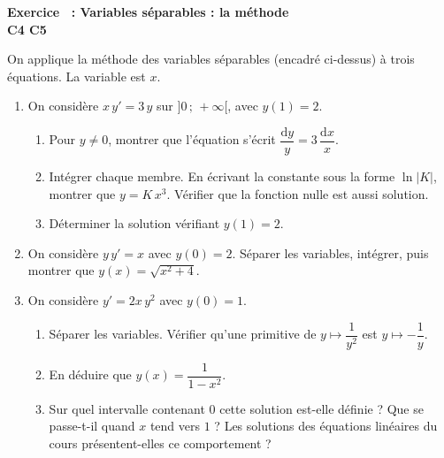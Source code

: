 \documentclass[a4paper,11pt]{article}
\newcounter{exo}
\newcommand{\exo}[4]{\needspace{0.5\textheight}\refstepcounter{exo}\label{exo:\theexo}\vspace{8pt}%
\begin{tcolorbox}[colback=uimmlightblue, colframe=uimmblue, boxrule=0.8pt, arc=2pt, left=6pt, right=6pt, top=3pt, bottom=3pt]
{\color{uimmblue}\bfseries Exercice \theexo\ : #1}\\
{\small\color{uimmred}\bfseries #2\quad #3}%
\if\relax\detokenize{#4}\relax\else\\{\footnotesize\color{uimmgray}\itshape #4}\fi
\end{tcolorbox}}
\newcommand{\rep}[1]{\par\noindent\begin{minipage}[t][#1cm]{\linewidth}\mbox{}\end{minipage}\par}
\newcommand{\dd}{\mathrm{d}}
\begin{document}
\exo{Variables séparables : la méthode}{C4 C5}{[S01] [C01] [C02]}{}
On applique la méthode des variables séparables (encadré ci-dessus) à trois équations. La variable est $x$.
\begin{enumerate}
  \needspace{5cm}
  \item On considère $x\,y' = 3\,y$ sur $]0\,;\,+\infty[$, avec $y(1) = 2$.
  \begin{enumerate}
    \item Pour $y \neq 0$, montrer que l'équation s'écrit $\dfrac{\dd y}{y} = 3\,\dfrac{\dd x}{x}$.
    \rep{2}
    \item Intégrer chaque membre. En écrivant la constante sous la forme $\ln|K|$, montrer que $y = K\,x^3$. Vérifier que la fonction nulle est aussi solution.
    \rep{3}
    \item Déterminer la solution vérifiant $y(1) = 2$.
    \rep{1.5}
  \end{enumerate}
  \needspace{4cm}
  \item On considère $y\,y' = x$ avec $y(0) = 2$. Séparer les variables, intégrer, puis montrer que $y(x) = \sqrt{x^2 + 4}$.
  \rep{3.5}
  \needspace{5cm}
  \item On considère $y' = 2x\,y^2$ avec $y(0) = 1$.
  \begin{enumerate}
    \item Séparer les variables. Vérifier qu'une primitive de $y \mapsto \dfrac{1}{y^2}$ est $y \mapsto -\dfrac{1}{y}$.
    \rep{2.5}
    \item En déduire que $y(x) = \dfrac{1}{1 - x^2}$.
    \rep{2.5}
    \item Sur quel intervalle contenant $0$ cette solution est-elle définie ? Que se passe-t-il quand $x$ tend vers $1$ ? Les solutions des équations linéaires du cours présentent-elles ce comportement ?
    \rep{2.5}
  \end{enumerate}
\end{enumerate}
\end{document}
